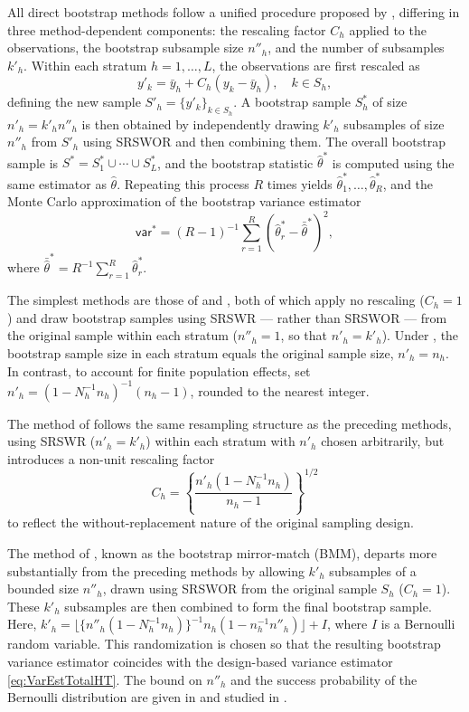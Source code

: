 All direct bootstrap methods follow a unified procedure proposed by \citet{Mashreghi:Haziza:Leger:2016}, differing in three method-dependent components: the rescaling factor \(C_h\) applied to the observations, the bootstrap subsample size \(n''_h\), and the number of subsamples \(k'_h\). Within each stratum \(h = 1, \ldots, L\), the observations are first rescaled as
\[
    y'_k = \bar{y}_h + C_h(y_k - \bar{y}_h), \quad k \in \textrm{$S$}_h,
\]
defining the new sample \(\textrm{$S$}'_h = \{y'_k\}_{k \in \textrm{$S$}_h}\). A bootstrap sample \(\textrm{$S$}_h^*\) of size \(n'_h = k'_h n''_h\) is then obtained by independently drawing \(k'_h\) subsamples of size \(n''_h\) from \(\textrm{$S$}'_h\) using SRSWOR and then combining them. The overall bootstrap sample is \(\textrm{$S$}^* = \textrm{$S$}_1^* \cup \cdots \cup \textrm{$S$}_L^*\), and the bootstrap statistic \(\hat{\theta}^*\) is computed using the same estimator as \(\hat{\theta}\). Repeating this process \(R\) times yields \(\hat{\theta}_1^*,\ldots,\hat{\theta}_R^*\), and the Monte Carlo approximation of the bootstrap variance estimator
\begin{equation}
    \mathsf{var}^* = (R - 1)^{-1} \sum_{r=1}^{R} (\hat{\theta}_r^* - \bar{\hat{\theta}}^*)^2,
    \label{eq:MCVarOneloop}
\end{equation}
where \(\bar{\hat{\theta}}^* = R^{-1} \sum_{r=1}^{R} \hat{\theta}_r^*\).

The simplest methods are those of \citet{Efron:1979} and \citet{McCarthy:Snowden:1985}, both of which apply no rescaling (\(C_h = 1\)) and draw bootstrap samples using SRSWR --- rather than SRSWOR --- from the original sample within each stratum (\(n''_h = 1\), so that \(n'_h = k'_h\)). Under \citet{Efron:1979}, the bootstrap sample size in each stratum equals the original sample size, \(n'_h = n_h\). In contrast, to account for finite population effects, \citet{McCarthy:Snowden:1985} set \(n'_h = (1 - N_h^{-1}n_h)^{-1}(n_h - 1)\), rounded to the nearest integer.

The method of \citet{Rao:Wu:1988} follows the same resampling structure as the preceding methods, using SRSWR (\(n'_h = k'_h\)) within each stratum with \(n'_h\) chosen arbitrarily, but introduces a non-unit rescaling factor
\[
    C_h = \left\{\frac{n'_h(1 - N_h^{-1}n_h)}{n_h - 1}\right\}^{1/2}
\]
to reflect the without-replacement nature of the original sampling design.

The method of \citet{Sitter:1992b}, known as the bootstrap mirror-match (BMM), departs more substantially from the preceding methods by allowing \(k'_h\) subsamples of a bounded size \(n''_h\), drawn using SRSWOR from the original sample \(\textrm{$S$}_h\) (\(C_h = 1\)). These \(k'_h\) subsamples are then combined to form the final bootstrap sample. Here, \(k'_h =\lfloor \{n''_h(1 - N_h^{-1} n_h)\}^{-1} n_h(1 - n_h^{-1} n''_h) \rfloor + I\), where \(I\) is a Bernoulli random variable. This randomization is chosen so that the resulting bootstrap variance estimator coincides with the design-based variance estimator \eqref{eq:VarEstTotalHT}. The bound on \(n''_h\) and the success probability of the Bernoulli distribution are given in \citet{Sitter:1992b} and studied in \citet{Mashreghi:Haziza:Leger:2016}.

